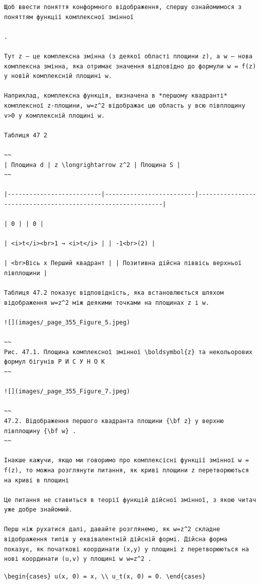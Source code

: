 \documentclass[
  ukrainian,
]{article}
\begin{document}
\begin{verbatim}
Щоб ввести поняття конформного відображення, спершу ознайомимося з поняттям функції комплексної змінної

.

Тут z — це комплексна змінна (з деякої області площини z), а w — нова комплексна змінна, яка отримає значення відповідно до формули w = f(z) у новій комплексній площині w.

Наприклад, комплексна функція, визначена в *першому квадранті* комплексної z-площини, w=z^2 відображає цю область у всю півплощину v>0 у комплексній площині w.

Таблиця 47 2

~~
| Площина d | z \longrightarrow z^2 | Площина S |
~~

|--------------------------|-------------------------|------------------------------------------------------------|

| 0 | | 0 |

| <i>t</i><br>1 → <i>t</i> | | -1<br>(2) |

| <br>Вісь x Перший квадрант | | Позитивна дійсна піввісь верхньої півплощини |

Таблиця 47.2 показує відповідність, яка встановлюється шляхом відображення w=z^2 між деякими точками на площинах z і w.

![](images/_page_355_Figure_5.jpeg)

~~
Рис. 47.1. Площина комплексної змінної \boldsymbol{z} та некольорових формул бігунів Р И С У Н О К
~~

![](images/_page_355_Figure_7.jpeg)

~~
47.2. Відображення першого квадранта площини {\bf z} у верхню півплощину {\bf w} .
~~

Інакше кажучи, якщо ми говоримо про комплексісні функції змінної w = f(z), то можна розглянути питання, як криві площини z перетворюються на криві в площині

Це питання не ставиться в теорії функцій дійсної змінної, з якою читач уже добре знайомий.

Перш ніж рухатися далі, давайте розглянемо, як w=z^2 складне відображення типів у еквівалентній дійсній формі. Дійсна форма показує, як початкові координати (x,y) у площині z перетворюються на нові координати (u,v) у площині w w=z^2 .
\end{verbatim}

\texttt{\textbackslash{}begin\{cases\}\ u(x,\ 0)\ =\ x,\ \textbackslash{}\textbackslash{}\ u\_t(x,\ 0)\ =\ 0.\ \textbackslash{}end\{cases\}}
\end{document}
